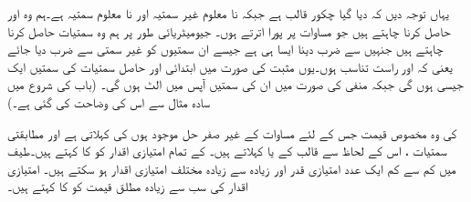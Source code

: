 یہاں توجہ دیں کہ  دیا گیا چکور قالب ہے جبکہ  نا معلوم غیر سمتیہ اور  نا معلوم سمتیہ ہے۔ہم وہ  اور  حاصل کرنا چاہتے ہیں جو مساوات  پر پورا اترتے ہوں۔ جیومیٹریائی طور پر ہم وہ سمتیات  حاصل کرنا چاہتے ہیں جنہیں  سے ضرب دینا ایسا ہی ہے جیسے ان سمتیوں کو غیر سمتی  سے ضرب دیا جائے یعنی کہ  اور  راست تناسب ہوں۔یوں مثبت  کی صورت میں ابتدائی اور حاصل سمتیات کی سمتیں ایک جیسی ہوں گی جبکہ منفی  کی صورت میں ان کی سمتیں آپس میں الٹ ہوں گی۔ (باب کی شروع میں سادہ مثال سے اس کی وضاحت کی گئی ہے۔)

  کی وہ مخصوص قیمت جس کے لئے مساوات  کے غیر صفر  حل موجود ہوں   کی  کہلاتی ہے اور مطابقتی سمتیات ،  اس  کے لحاظ سے قالب  کے   یا  کہلاتے ہیں۔ کے تمام امتیازی اقدار کو  کا  کہتے ہیں۔طیف میں کم سے کم ایک عدد امتیازی قدر اور زیادہ سے زیادہ  مختلف امتیازی اقدار ہو سکتے ہیں۔ امتیازی اقدار کی سب سے  زیادہ مطلق قیمت کو  کا  کہتے ہیں۔

